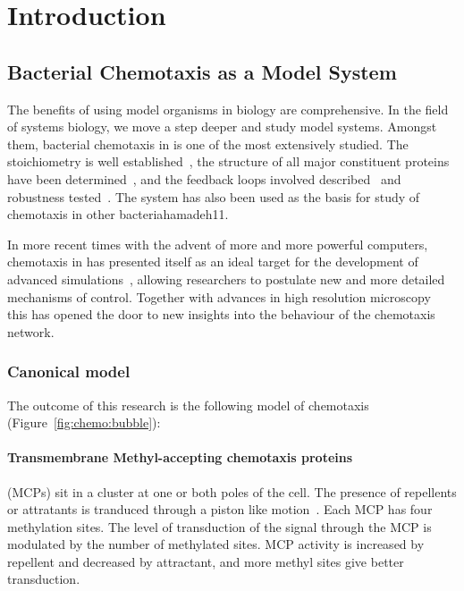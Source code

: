 \documentclass[../main.tex]{subfiles}
\begin{document}
\section{Introduction}

\subsection{Bacterial Chemotaxis as a Model System}
The benefits of using model organisms in biology are comprehensive. In the field of systems biology, we move a step deeper and study model systems. Amongst them, bacterial chemotaxis in \ecolilong is one of the most extensively studied. The stoichiometry is well established~\citep{li04}, the structure of all major constituent proteins have been determined~\citep{zhou02, milligan87, stock89}, and the feedback loops involved described~\citep{kentner09} and robustness tested~\citep{yi00}. The \ecoli system has also been used as the basis for study of chemotaxis in other bacteria{hamadeh11}.

In more recent times with the advent of more and more powerful computers, chemotaxis in \ecoli has presented itself as an ideal target for the development of advanced simulations~\citep{bray93, lipkow05, miller10}, allowing researchers to postulate new and more detailed mechanisms of control. Together with advances in high resolution microscopy~\citep{greenfield09} this has opened the door to new insights into the behaviour of the \ecoli chemotaxis network.

\subsubsection{Canonical model}

The outcome of this research is the following model of chemotaxis (Figure~\ref{fig:chemo:bubble}):

\paragraph{Transmembrane Methyl-accepting chemotaxis proteins} (MCPs) sit in a cluster at one or both poles of the cell. The presence of repellents or attratants is tranduced through a piston like motion~\citep{hall11}. Each MCP has four methylation sites. The level of transduction of the signal through the MCP is modulated by the number of methylated sites. MCP activity is increased by repellent and decreased by attractant, and more methyl sites give better transduction.
\end{document}
